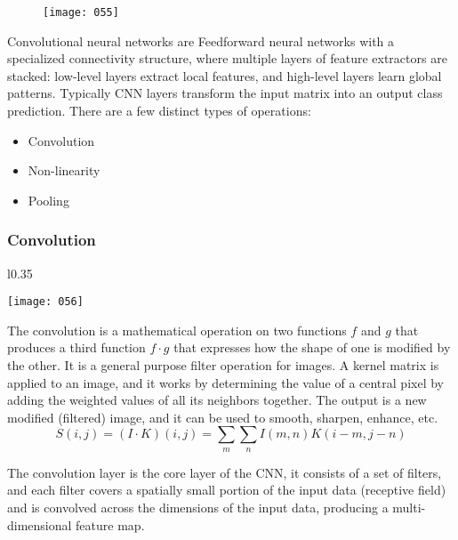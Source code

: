 \begin{figure}[h!]
    \centering
    \texttt{[image: 055]}
    \caption{}
    \label{fig:055}
\end{figure}

Convolutional neural networks are Feedforward neural networks with a specialized connectivity structure, where multiple layers of feature extractors are stacked: low-level layers extract local features, and high-level layers learn global patterns. Typically CNN layers transform the input matrix into an output class prediction. There are a few distinct types of operations:
\begin{itemize}[topsep={0pt}, partopsep={0pt}]
    \itemsep0pt
    \item Convolution
    \item Non-linearity
    \item Pooling
\end{itemize}

\subsubsection{Convolution}
\begin{wrapfigure}{l}{0.35\textwidth}
    \begin{center}
        \texttt{[image: 056]}
        \caption{}
    \end{center}
    \label{fig:056}
\end{wrapfigure}

The convolution is a mathematical operation on two functions \(f\) and \(g\) that produces a third function \(f \cdot g\) that expresses how the shape of one is modified by the other. It is a general purpose filter operation for images. A kernel matrix is applied to an image, and it works by determining the value of a central pixel by adding the weighted values of all its neighbors together. The output is a new modified (filtered) image, and it can be used to smooth, sharpen, enhance, etc.
\begin{equation}
    S(i,j) = (I \cdot K)(i,j) = \sum_m \sum_n I(m,n)K(i-m,j-n)
\end{equation}

The convolution layer is the core layer of the CNN, it consists of a set of filters, and each filter covers a spatially small portion of the input data (receptive field) and is convolved across the dimensions of the input data, producing a multi-dimensional feature map.

